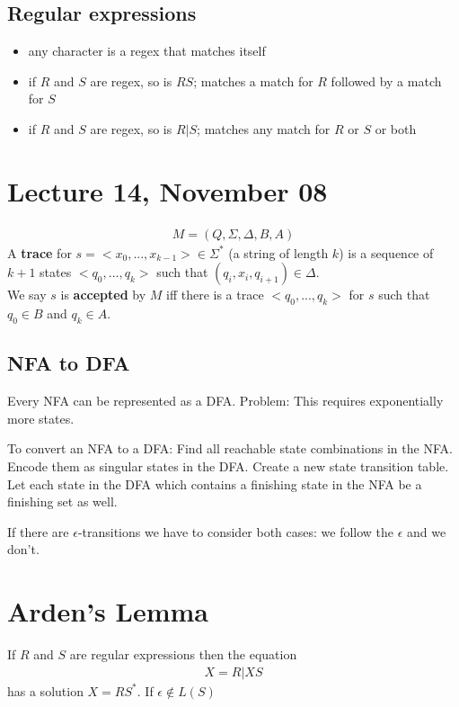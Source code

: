 \documentclass{article}
\begin{document}
\subsection{Regular expressions}
\begin{definition}
    \begin{itemize}
        \item any character is a regex that matches itself
        \item if $R$ and $S$ are regex, so is $RS$; matches a match for $R$ followed by a match for $S$
        \item if $R$ and $S$ are regex, so is $R|S$; matches any match for $R$ or $S$ or both
    \end{itemize}
\end{definition}
\section{Lecture 14, November 08}
\begin{definition}
    \begin{align*}
        M=(Q,\Sigma, \Delta, B, A)
    \end{align*}
    A \textbf{trace} for $s=<x_0,..., x_{k-1}>\in \Sigma^*$ (a string of length $k$) is a sequence of $k+1$ states $<q_0, ..., q_k>$ such that $(q_i, x_i, q_{i+1})\in\Delta$.\\
    We say $s$ is \textbf{accepted} by $M$ iff there is a trace $<q_0, ..., q_k>$ for $s$ such that $q_0\in B$ and $q_k\in A$.
\end{definition}
\subsection{NFA to DFA}
Every NFA can be represented as a DFA. Problem: This requires exponentially more states.
\begin{example}
    To convert an NFA to a DFA: Find all reachable state combinations in the NFA. Encode them as singular states in the DFA. Create a new state transition table. Let each state in the DFA which contains a finishing state in the NFA be a finishing set as well.
\end{example}
If there are $\epsilon$-transitions we have to consider both cases: we follow the $\epsilon$ and we don't.
\section{Arden's Lemma}
\begin{theorem}
    If $R$ and $S$ are regular expressions then the equation\begin{align*}
        X = R | X S
    \end{align*}
    has a solution $X = R S^*$. If $\epsilon\not\in L(S)$ 
\end{theorem}
\end{document}
